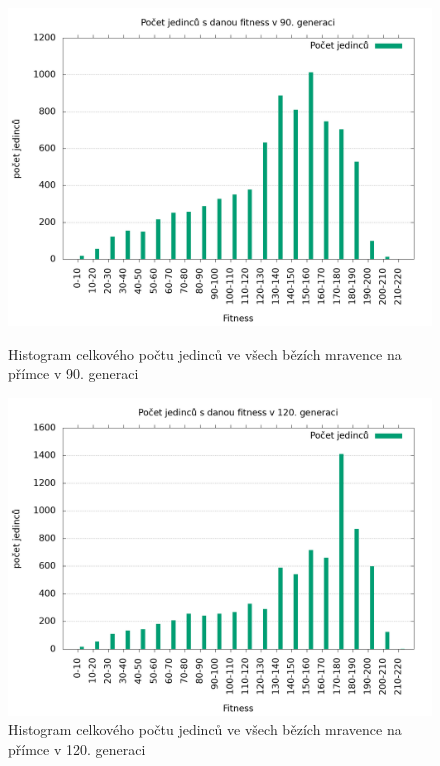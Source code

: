 \begin{figure}[h]
    \begin{minipage}[c]{0.48\linewidth}
        \includegraphics[width=\linewidth]{obrazky/mravenec_primka_fitnessHistogram90.png}
        \caption{Histogram celkového počtu jedinců ve všech bězích mravence na přímce v 90. generaci}
    \end{minipage}
    \hfill
    \begin{minipage}[c]{0.48\linewidth}
        \includegraphics[width=\linewidth]{obrazky/mravenec_primka_fitnessHistogram120.png}
        \caption{Histogram celkového počtu jedinců ve všech bězích mravence na přímce v 120. generaci}
    \end{minipage}
\end{figure}

